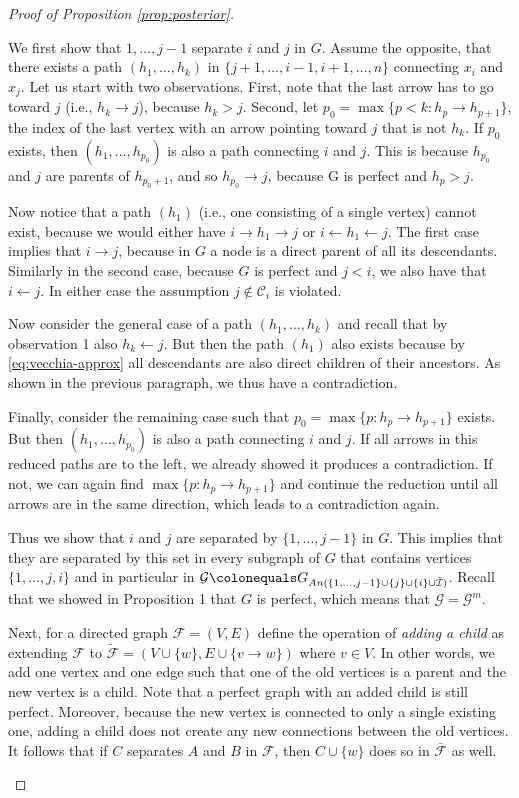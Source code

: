 \documentclass[12pt,letterpaper]{article}
\theoremstyle{propstyle}
\theoremstyle{propstyle}
\theoremstyle{propstyle}
\theoremstyle{propstyle}
\theoremstyle{propstyle}
\newcommand{\condset}{\mathcal{C}}
\newcommand{\obs}{\mathcal{I}}
\begin{document}
\begin{proof}[Proof of Proposition \ref{prop:posterior}]
\begin{enumerate}
We first show that $1, \dots, j-1$ separate $i$ and $j$ in $G$. Assume the opposite, that there exists a path $(h_1, \dots, h_k)$ in $\{j+1, \dots, i-1, i+1, \dots, n\}$ connecting $x_i$ and $x_j$. Let us start with two observations. First, note that the last arrow has to go toward $j$ (i.e., $h_k \rightarrow j$), because $h_k>j$. Second, let $p_0 = \max\{p < k: h_p \rightarrow h_{p+1}\}$, the index of the last vertex with an arrow pointing toward $j$ that is not $h_k$. If $p_0$ exists, then $(h_1, \dots, h_{p_0})$ is also a path connecting $i$ and $j$. This is because $h_{p_0}$ and $j$ are parents of $h_{p_0+1}$, and so $h_{p_0} \rightarrow j$, because G is perfect and $h_p > j$.

Now notice that a path $(h_1)$ (i.e., one consisting of a single vertex) cannot exist, because we would either have $i \rightarrow h_1 \rightarrow j$ or $i \leftarrow h_1 \leftarrow j$. The first case implies that $i \rightarrow j$, because in $G$ a node is a direct parent of all its descendants. Similarly in the second case, because $G$ is perfect and $j<i$, we also have that $i \leftarrow j$. In either case the assumption $j \not\in \condset_i$ is violated.

Now consider the general case of a path $(h_1, \dots, h_k)$ and recall that by observation 1 also  $h_k \leftarrow j$. But then the path $(h_1)$ also exists because by \ref{eq:vecchia-approx} all descendants are also direct children of their ancestors. As shown in the previous paragraph, we thus have a contradiction.

Finally, consider the remaining case such that $p_0 = \max\{p:h_p \rightarrow h_{p+1}\}$ exists. But then $(h_1, \dots, h_{p_0})$ is also a path connecting $i$ and $j$. 
If all arrows in this reduced paths are to the left, we already showed it produces a contradiction. If not, we can again find $\max\{p: h_p \rightarrow h_{p+1}\}$ and continue the reduction until all arrows are in the same direction, which leads to a contradiction again. 

Thus we show that $i$ and $j$ are separated by $\{1, \dots, j-1\}$ in $G$. This implies that they are separated by this set in every subgraph of $G$ that contains vertices $\{1, \dots, j, i\}$ and in particular in $\mathcal{G} \colonequals G_{An(\{1, \dots, j-1\} \cup \{j\}\cup \{i\}\cup \tilde{\obs})}$. Recall that we showed in Proposition 1 that $G$ is perfect, which means that $\mathcal{G} = \mathcal{G}^m$.

Next, for a directed graph $\mathcal{F} = (V, E)$ define the operation of \emph{adding a child} as extending $\mathcal{F}$ to $\tilde{\mathcal{F}} = \left(V \cup \{w\}, E \cup \{v \rightarrow w\}\right)$ where $v \in V$. In other words, we add one vertex and one edge such that one of the old vertices is a parent and the new vertex is a child. Note that a perfect graph with an added child is still perfect. Moreover, because the new vertex is connected to only a single existing one, adding a child does not create any new connections between the old vertices. It follows that if $C$ separates $A$ and $B$ in $\mathcal{F}$, then $C \cup \{w\}$ does so in $\bar{\mathcal{F}}$ as well.


\end{enumerate}
\end{proof}
\end{document}
